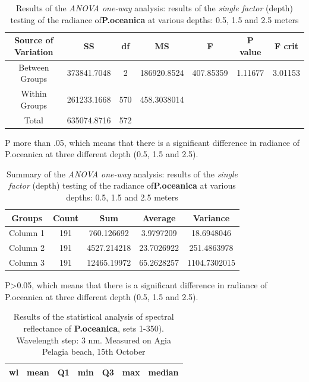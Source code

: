 \documentclass[10pt, a4paper]{article}
\begin{document}
\begin{appendices}
\begin{table}[htbp]
\caption{Results of the \textit{ANOVA one-way} analysis: results of the \textit{single factor} (depth) testing of the radiance of\textbf{P.oceanica} at various depths: 0.5, 1.5 and 2.5 meters}
\label{tab:8}
\begin{center}
\begin{tabular}{|c|c|c|c|c|c|c|}
\hline\hline
\textbf{Source of Variation} & \textbf{SS} & \textbf{df} & \textbf{MS} & \textbf{F} & \textbf{P value} & \textbf{F crit} \\ \hline
Between Groups & 373841.7048 & 2 & 186920.8524 & 407.85359 & 1.11677 & 3.01153 \\ \hline
Within Groups & 261233.1668 & 570 & 458.3038014 & & & \\ \hline
Total &  635074.8716 & 572 & & & & \\ \hline
\end{tabular}
\end{center}
P more than .05, which means that there is a significant difference in radiance of P.oceanica at three different depth (0.5, 1.5 and 2.5). 
\label{fig:5}
\end{table}

\begin{table}[htbp]
\caption{Summary of the \textit{ANOVA one-way} analysis: results of the \textit{single factor} (depth) testing of the radiance of\textbf{P.oceanica} at various depths: 0.5, 1.5 and 2.5 meters}
\label{tab:9}
\begin{center}
\begin{tabular}{|c|c|c|c|c|}
\hline\hline
\textbf{Groups} & \textbf{Count} & \textbf{Sum} & \textbf{Average} & \textbf{Variance} \\ \hline\hline
Column 1 & 191 &	760.126692 & 3.9797209 & 18.6948046 \\ \hline
Column 2 & 191 &	4527.214218 & 23.7026922  & 251.4863978 \\ \hline
Column 3 & 191 &	12465.19972 & 65.2628257 & 1104.7302015 \\ \hline
\end{tabular}
\end{center}
P>0.05, which means that there is a significant difference in radiance of P.oceanica at three different depth (0.5, 1.5 and 2.5). 
\label{fig:5}
\end{table}
\pagebreak

\begin{longtable}{|c|c|c|c|c|c|c|}
\caption{Results of the statistical analysis of spectral reflectance of \textbf{P.oceanica}, sets 1-350). Wavelength step: 3 nm. Measured on Agia Pelagia beach, 15th October} 
\label{tab:10} \\
\hline
  \multicolumn{1}{|l|}{\textbf{wl}} &
   \multicolumn{1}{l|}{\textbf{mean}} & 
   \multicolumn{1}{l|}{\textbf{Q1}} & 
   \multicolumn{1}{l|}{\textbf{min}} & 
   \multicolumn{1}{l|}{\textbf{Q3}} & 
   \multicolumn{1}{l|}{\textbf{max}} & 
   \multicolumn{1}{l|}{\textbf{median}} \\ \hline
\endfirsthead


\end{longtable}
\end{appendices}
\end{document}
